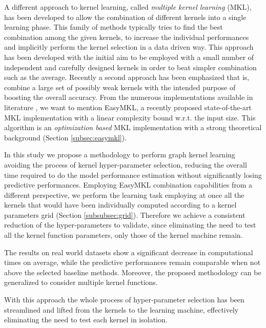 A different approach to kernel learning, called \emph{multiple kernel learning} (MKL), has been
developed to allow the combination of different kernels into a single learning phase.
This family of methods typically tries to find the best combination among the
given kernels, to increase the individual performances and implicitly perform the
kernel selection in a data driven way.
This approach has been developed with the initial aim to be employed with a small
number of independent and carefully designed kernels in order to beat simpler combination
such as the average.
Recently a second approach has been emphasized that is, combine a large set of possibly
weak kernels with the intended purpose of boosting the overall accuracy.
From the numerous implementations available in literature \cite{journals/jmlr/GonenA11},
we want to mention EasyMKL, a recently proposed state-of-the-art MKL implementation
\cite{aiolli2015easymkl} with a linear complexity bound w.r.t. the input size.
This algorithm is an \emph{optimization based} MKL implementation with a strong
theoretical background (Section \ref{subsec:easymkl}).

In this study we propose a methodology to perform graph kernel learning avoiding
the process of kernel hyper-parameter selection, reducing the overall time
required to do the model performance estimation without significantly losing
predictive performances.
Employing EasyMKL combination capabilities from a different perspective, we
perform the learning task employing at once all the kernels that would have been
individually computed according to a kernel parameters grid (Section \ref{subsubsec:grid}).
Therefore we achieve a consistent reduction of the hyper-parameters to validate, since
eliminating the need to test all the kernel function parameters, only those of the
kernel machine remain.


The results on real world datasets show a significant decrease in computational
times on average, while the predictive performances remain comparable when not
above the selected baseline methods.
Moreover, the proposed methodology can be generalized to consider multiple kernel functions.

With this approach the whole process of hyper-parameter selection has been streamlined and
lifted from the kernels to the learning machine, effectively eliminating the need to test each
kernel in isolation.


